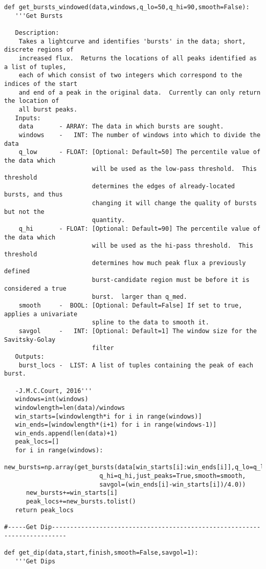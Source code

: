 \begin{verbatim}
def get_bursts_windowed(data,windows,q_lo=50,q_hi=90,smooth=False):
   '''Get Bursts

   Description:
    Takes a lightcurve and identifies 'bursts' in the data; short, discrete regions of
    increased flux.  Returns the locations of all peaks identified as a list of tuples,
    each of which consist of two integers which correspond to the indices of the start
    and end of a peak in the original data.  Currently can only return the location of
    all burst peaks.
   Inputs:
    data       - ARRAY: The data in which bursts are sought.
    windows    -   INT: The number of windows into which to divide the data
    q_low      - FLOAT: [Optional: Default=50] The percentile value of the data which
                        will be used as the low-pass threshold.  This threshold
                        determines the edges of already-located bursts, and thus
                        changing it will change the quality of bursts but not the
                        quantity.
    q_hi       - FLOAT: [Optional: Default=90] The percentile value of the data which
                        will be used as the hi-pass threshold.  This threshold
                        determines how much peak flux a previously defined
                        burst-candidate region must be before it is considered a true
                        burst.  larger than q_med.
    smooth     -  BOOL: [Optional: Default=False] If set to true, applies a univariate
                        spline to the data to smooth it.
    savgol     -   INT: [Optional: Default=1] The window size for the Savitsky-Golay
                        filter
   Outputs:
    burst_locs -  LIST: A list of tuples containing the peak of each burst.

   -J.M.C.Court, 2016'''
   windows=int(windows)
   windowlength=len(data)/windows
   win_starts=[windowlength*i for i in range(windows)]
   win_ends=[windowlength*(i+1) for i in range(windows-1)]
   win_ends.append(len(data)+1)
   peak_locs=[]
   for i in range(windows):
      new_bursts=np.array(get_bursts(data[win_starts[i]:win_ends[i]],q_lo=q_lo,
                          q_hi=q_hi,just_peaks=True,smooth=smooth,
                          savgol=(win_ends[i]-win_starts[i])/4.0))
      new_bursts+=win_starts[i]
      peak_locs+=new_bursts.tolist()
   return peak_locs

#-----Get Dip--------------------------------------------------------------------------

def get_dip(data,start,finish,smooth=False,savgol=1):
   '''Get Dips


\end{verbatim}
